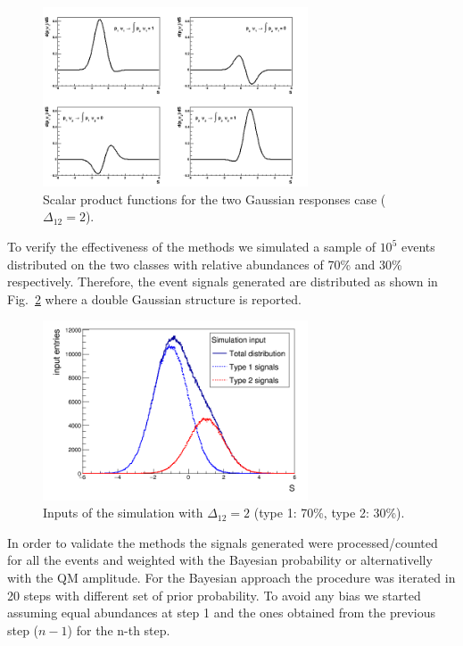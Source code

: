 \begin{figure}[!htb]
\centering
\includegraphics[width=0.7\textwidth]{../png/figSPgaus.png}
\caption{Scalar product functions for the two Gaussian responses case ($\Delta_{12} = 2$).}
\label{fig:SPGaus2}
\end{figure}

To verify the effectiveness of the methods we simulated a sample of $10^5$
events distributed on the two classes with relative abundances of 70\% and
30\% respectively.
Therefore, the event signals generated are distributed as shown in
Fig.~\ref{fig:InputGaus2} where a double Gaussian structure is reported.

\begin{figure}[!htb]
\centering
\includegraphics[width=0.7\textwidth]{../png/figInput.png}
\caption{Inputs of the simulation with $\Delta_{12} = 2$ (type 1: 70\%, type 2: 30\%).}
\label{fig:InputGaus2}
\end{figure}

In order to validate the methods the signals generated were processed/counted
for all the events and weighted with the Bayesian probability or
alternativelly with the QM amplitude.
For the Bayesian approach the procedure was iterated in 20 steps with
different set of prior probability. To avoid any bias we started assuming
equal abundances at step 1 and the ones obtained from the previous step
($n-1$) for the n-th step.

